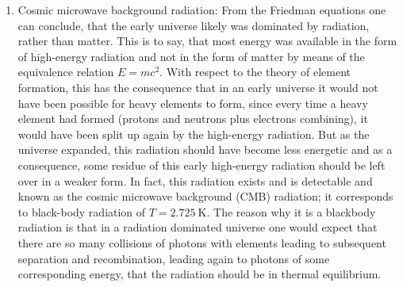\documentclass[a4paper,11pt]{article}
\numberwithin{equation}{section}
\begin{document}
{\begin{enumerate}
	\item Cosmic microwave background radiation: From the Friedman equations one can conclude, that the early universe likely was dominated by radiation, rather than matter. This is to say, that most energy was available in the form of high-energy radiation and not in the form of matter by means of the equivalence relation $E = mc^2$. With respect to the theory of element formation, this has the consequence that in an early universe it would not have been possible for heavy elements to form, since every time a heavy element had formed (protons and neutrons plus electrons combining), it would have been split up again by the high-energy radiation. But as the universe expanded, this radiation should have become less energetic and as a consequence, some residue of this early high-energy radiation should be left over in a weaker form. In fact, this radiation exists and is detectable and known as the cosmic microwave background (CMB) radiation; it corresponds to black-body radiation of $T=\SI{2.725}{\kelvin}$. The reason why it is a blackbody radiation is that in a radiation dominated universe one would expect that there are so many collisions of photons with elements leading to subsequent separation and recombination, leading again to photons of some corresponding energy, that the radiation should be in thermal equilibrium.
\end{enumerate}
}

\end{document}
